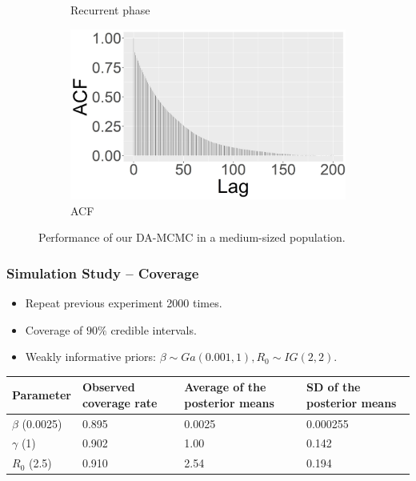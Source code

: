\documentclass{beamer}
\begin{document}
\begin{frame}
\begin{figure}
\begin{subfigure}[b]{0.32\textwidth}
			\caption{Recurrent phase}
			\label{fig:E1_burn_gamma_tp}
		\end{subfigure}
		\hfill
		\begin{subfigure}[b]{0.32\textwidth}
			\centering
			\includegraphics[width=\textwidth]{E6_burn_beta_acf_joint}
			\caption{ACF}
			\label{fig:E1_burn_gamma_acf}
		\end{subfigure}
		\caption{Performance of our DA-MCMC in a medium-sized population.}
		\label{fig:E1}
	\end{figure}
	
\end{frame}


\begin{frame} \frametitle{Simulation Study -- Coverage}  
	\begin{itemize}
		\item Repeat previous experiment 2000 times.
		\item Coverage of $90\%$ credible intervals.
		\item Weakly informative priors: $\beta \sim Ga(0.001,1), R_0 \sim IG(2, 2)$.
	\end{itemize} 
	
	\begin{table}
		\centering
		\begin{tabular}{ C{2cm}| *{3}{C{2.2cm}}}
			Parameter & Observed coverage rate & Average of the posterior means & SD of the posterior means \\ 
			\hline
			$\beta$ (0.0025) & 0.895 & 0.0025 & 0.000255 \\ 
			$\gamma$ (1) & 0.902 & 1.00 & 0.142 \\ 
			$R_0$ (2.5) & 0.910 & 2.54 & 0.194 \\
			\hline
		\end{tabular}
	\end{table}
\end{frame}
\end{document}
